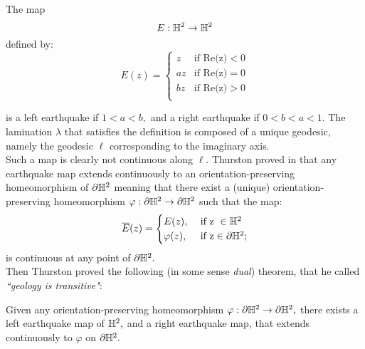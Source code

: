 \begin{example}\label{simplequake}
The map 
\[
    E:\mathbb{H}^2\to\mathbb{H}^2
\]
defined by:
\[
  E(z)= \begin{cases}
    z & \text{if Re(z)}<0 \\
    az & \text{if Re(z)}=0 \\
    bz & \text{if Re(z)}>0 \\    
\end{cases}
\]

is a left earthquake if $1<a<b,$ and a right earthquake if $0<b<a<1$. The lamination $\lambda$ that satisfies the definition is composed of a unique geodesic, namely the geodesic $\ell$ corresponding to the imaginary axis. \\
Such a map is clearly not continuous along $\ell$.
Thurston proved in \cite{thurston1986earthquakes} that any earthquake map extends continuously to an orientation-preserving homeomorphism of $\partial\mathbb{H}^2$ meaning that there exist a (unique) orientation-preserving homeomorphism $\varphi:\partial\mathbb{H}^2\to\partial\mathbb{H}^2$ such that the map:
\[
    \overline{E}(z)=\begin{cases}
        E(z), &\text{ if z }\in \mathbb{H}^2\\
        \varphi(z), &\text{ if z}\in \partial\mathbb{H}^2  ;\\
        
    \end{cases}
\]
is continuous at any point of $\partial\mathbb{H}^2.$\\
Then Thurston proved the following (in some sense \textit{dual}) theorem, that he called \textit{``geology is transitive"}:

\begin{theorem}\label{earttheorem}
    Given any orientation-preserving homeomorphism $\varphi:\partial\mathbb{H}^2\to\partial\mathbb{H}^2,$ there exists a left earthquake map of $\mathbb{H}^2,$ and a right earthquake map, that extends continuously to $\varphi$ on $\partial\mathbb{H}^2.$
\end{theorem}
\end{example}


